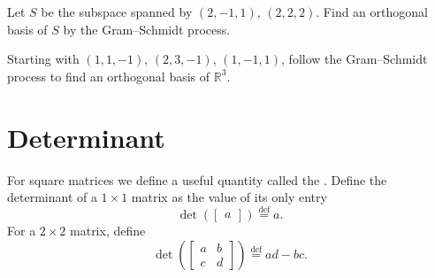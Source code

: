 \begin{exercise}
Let $S$ be the subspace spanned by
$(2,-1,1)$, $(2,2,2)$.  Find an orthogonal basis of $S$
by the Gram--Schmidt process.
\end{exercise}

\begin{exercise}
Starting with $(1,1,-1)$, $(2,3,-1)$, $(1,-1,1)$, follow the Gram--Schmidt
process to find an orthogonal basis of ${\mathbb{R}}^3$.
\end{exercise}


\sectionnewpage
\section{Determinant}
\label{det:section}


For square matrices we define a useful quantity called the
\emph{}.  Define
the determinant of a $1 \times 1$ matrix as the value of its only entry
\begin{equation*}
\det \left(
\begin{bmatrix}
a 
\end{bmatrix}
\right)
\overset{\text{def}}{=}
a .
\end{equation*}
For a $2 \times 2$ matrix, define
\begin{equation*}
\det \left(
\begin{bmatrix}
a & b \\
c & d
\end{bmatrix}
\right)
\overset{\text{def}}{=}
ad-bc .
\end{equation*}

